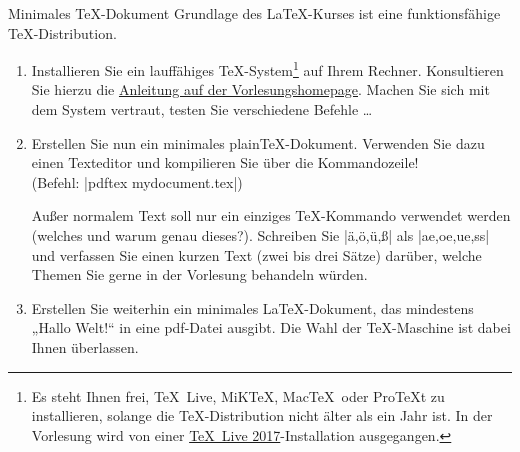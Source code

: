 \documentclass[
	vorläufig=false, 
	blattnr=0,
	ausgabe=2017-10-20,
	abgabe=2017-10-27,
	lösung=true,
	shortverb,
]{../tex/latexkurs-exercise}
\begin{document}
\begin{abstract}
	\noindent Achtung: Da die Installation der \TeX-Distribution grundlegend für den Kurs ist,
	muss die Abgabe für dieses Blatt von jedem einzeln bearbeitet werden. \\
	\emph{Keine Gruppenabgabe!}
\end{abstract}

\begin{aufgabe}[12]{Minimales \TeX-Dokument}
	Grundlage des \LaTeX-Kurses ist eine funktionsfähige \TeX-Distribution. 
	\begin{enumerate}[label=\alph*)]
		\item Installieren Sie ein lauffähiges \TeX-System\footnote{ Es steht Ihnen frei, \TeX~Live, MiK\TeX, Mac\TeX~oder Pro\TeX t zu installieren, solange die \TeX-Distribution nicht älter als ein Jahr ist. In der Vorlesung wird von einer \href{http://www.tug.org/texlive/}{\TeX~Live 2017}-Installation ausgegangen.} auf Ihrem Rechner. Konsultieren Sie hierzu die \href{http://latexkurs.github.io/exercises/00_texlive_installation.pdf}{Anleitung auf der Vorlesungshomepage}. Machen Sie sich mit dem System vertraut, testen Sie verschiedene Befehle …

		\item \label{aufg:texdoc} Erstellen Sie nun ein minimales plain\TeX-Dokument. Verwenden Sie dazu einen Texteditor und kompilieren Sie über die Kommandozeile! \\(Befehl: |pdftex mydocument.tex|)

		Außer normalem Text soll nur ein einziges \TeX-Kommando verwendet werden (welches und warum genau dieses?). Schreiben Sie |ä,ö,ü,ß| als |ae,oe,ue,ss| und verfassen Sie einen kurzen Text (zwei bis drei Sätze) darüber, welche Themen Sie gerne in der Vorlesung behandeln würden.

		\item \label{aufg:latexdoc} Erstellen Sie weiterhin ein minimales \LaTeX-Dokument, das mindestens „Hallo Welt!“ in eine pdf-Datei ausgibt. Die Wahl der \TeX-Maschine ist dabei Ihnen überlassen.
	\end{enumerate}
\end{aufgabe}


\end{document}
